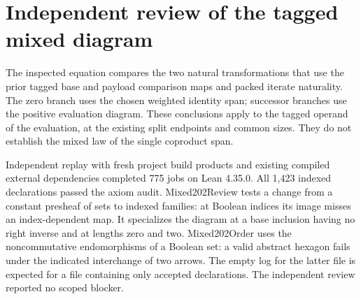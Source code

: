 \documentclass{article}
\begin{document}
\section*{Independent review of the tagged mixed diagram}
The inspected equation compares the two natural transformations that use the prior tagged base and payload comparison maps and packed iterate naturality. The zero branch uses the chosen weighted identity span; successor branches use the positive evaluation diagram. These conclusions apply to the tagged operand of the evaluation, at the existing split endpoints and common sizes. They do not establish the mixed law of the single coproduct span.
\par Independent replay with fresh project build products and existing compiled external dependencies completed 775 jobs on Lean 4.35.0. All 1,423 indexed declarations passed the axiom audit. Mixed202Review tests a change from a constant presheaf of sets to indexed families: at Boolean indices its image misses an index-dependent map. It specializes the diagram at a base inclusion having no right inverse and at lengths zero and two. Mixed202Order uses the noncommutative endomorphisms of a Boolean set: a valid abstract hexagon fails under the indicated interchange of two arrows. The empty log for the latter file is expected for a file containing only accepted declarations. The independent review reported no scoped blocker.
\end{document}
